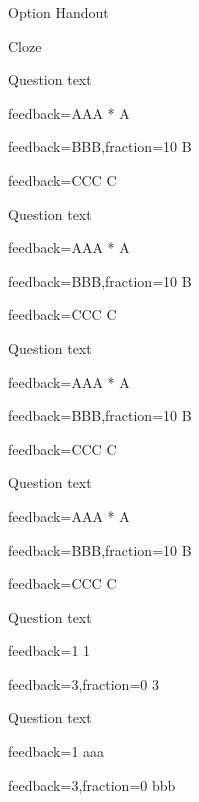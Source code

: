 \documentclass{article}
\begin{document}
\begin{quiz}[points=1,tags={tag},feedback={General feedback},shuffle]{ Option 
Handout}
\begin{cloze}{Cloze}
\begin{multi}[inline,shuffle=false]
Question text
\item[feedback={AAA}]* A
\item[feedback={BBB},fraction=10] B
\item[feedback={CCC}] C
\end{multi}

\begin{multi}[horizontal]
Question text
\item[feedback={AAA}]* A
\item[feedback={BBB},fraction=10] B
\item[feedback={CCC}] C
\end{multi}

\begin{multi}[vertical]
Question text
\item[feedback={AAA}]* A
\item[feedback={BBB},fraction=10] B
\item[feedback={CCC}] C
\end{multi}

\begin{multi}[inline]
Question text
\item[feedback={AAA}]* A
\item[feedback={BBB},fraction=10] B
\item[feedback={CCC}] C
\end{multi}

\begin{numerical}[tolerance=1]
Question text
\item[feedback={1}] 1
\item[feedback={3},fraction=0] 3
\end{numerical}

\begin{shortanswer}[tolerance=1]
Question text
\item[feedback={1}] aaa
\item[feedback={3},fraction=0] bbb
\end{shortanswer}

\end{cloze}

\end{quiz}
\end{document}

